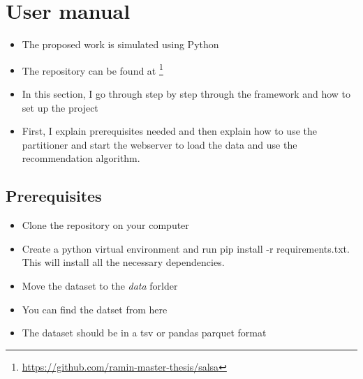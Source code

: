 \section{User manual}
\label{sec:user-guide}
\begin{itemize}
    \item The proposed work is simulated using Python
    \item The repository can be found at \footnote{\url{https://github.com/ramin-master-thesis/salsa}}
    \item In this section, I go through step by step through the framework and how to set up the project
    \item First, I explain prerequisites needed and then explain how to use the partitioner and start the webserver to load the data and use the recommendation algorithm.
\end{itemize}

\subsection{Prerequisites}
\label{subsec:prerequisites}
\begin{itemize}
    \item Clone the repository on your computer
    \item Create a python virtual environment and run pip install -r requirements.txt. This will install all the necessary dependencies.
    \item Move the dataset to the \emph{data} forlder
    \item You can find the datset from here 
    \item The dataset should be in a tsv or pandas parquet format
\end{itemize}

